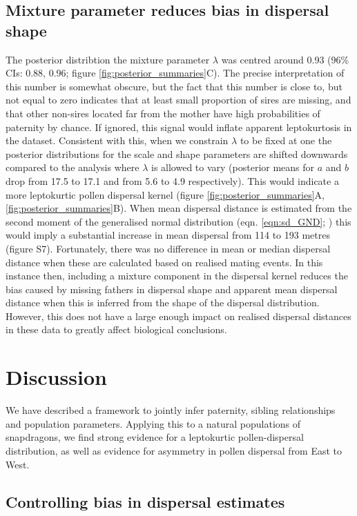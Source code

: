\documentclass[10pt, a4paper, twocolumn]{article} %
\begin{document}
\subsection{Mixture parameter reduces bias in dispersal shape}

The posterior distribtion the mixture parameter $\lambda$ was centred around 0.93 (96\% CIs: 0.88, 0.96; figure \ref{fig:posterior_summaries}C).
The precise interpretation of this number is somewhat obscure, but the fact that this number is close to, but not equal to zero indicates that at least small proportion of sires are missing, and that other non-sires located far from the mother have high probabilities of paternity by chance.
If ignored, this signal would inflate apparent leptokurtosis in the dataset.
Consistent with this, when we constrain $\lambda$ to be fixed at one the posterior distributions for the scale and shape parameters are shifted downwards compared to the analysis where $\lambda$ is allowed to vary (posterior means for $a$ and $b$ drop from 17.5 to 17.1 and from 5.6 to 4.9 respectively).
This would indicate a more leptokurtic pollen dispersal kernel (figure \ref{fig:posterior_summaries}A, \ref{fig:posterior_summaries}B).
When mean dispersal distance is estimated from the second moment of the generalised normal distribution (eqn. \ref{eqn:sd_GND}; \cite{clark1998trees}) this would imply a substantial increase in mean dispersal from 114 to 193 metres (figure S7).
Fortunately, there was no difference in mean or median dispersal distance when these are calculated based on realised mating events.
In this instance then, including a mixture component in the dispersal kernel reduces the bias caused by missing fathers in dispersal shape and apparent mean dispersal distance when this is inferred from the shape of the dispersal distribution.
However, this does not have a large enough impact on realised dispersal distances in these data to greatly affect biological conclusions.

\section{Discussion}

We have described a framework to jointly infer paternity, sibling relationships and population parameters. 
Applying this to a natural populations of snapdragons, we find strong evidence for a leptokurtic pollen-dispersal distribution, as well as evidence for asymmetry in pollen dispersal from East to West.

\subsection{Controlling bias in dispersal estimates}
\end{document}
